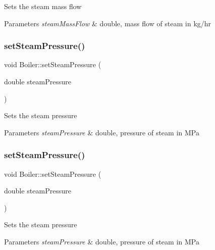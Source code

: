 Sets the steam mass flow 
\begin{DoxyParams}{Parameters}
{\em steam\+Mass\+Flow} & double, mass flow of steam in kg/hr \\
\hline
\end{DoxyParams}
\mbox{\label{class_boiler_a0a4619ff73c9969daebe3aa66ddad6be}} 
\subsubsection{\texorpdfstring{set\+Steam\+Pressure()}{setSteamPressure()}\hspace{0.1cm}{\footnotesize\ttfamily [1/3]}}
{\footnotesize\ttfamily void Boiler\+::set\+Steam\+Pressure (\begin{DoxyParamCaption}\item[{double}]{steam\+Pressure }\end{DoxyParamCaption})}

Sets the steam pressure 
\begin{DoxyParams}{Parameters}
{\em steam\+Pressure} & double, pressure of steam in M\+Pa \\
\hline
\end{DoxyParams}
\mbox{\label{class_boiler_a0a4619ff73c9969daebe3aa66ddad6be}} 
\subsubsection{\texorpdfstring{set\+Steam\+Pressure()}{setSteamPressure()}\hspace{0.1cm}{\footnotesize\ttfamily [2/3]}}
{\footnotesize\ttfamily void Boiler\+::set\+Steam\+Pressure (\begin{DoxyParamCaption}\item[{double}]{steam\+Pressure }\end{DoxyParamCaption})}

Sets the steam pressure 
\begin{DoxyParams}{Parameters}
{\em steam\+Pressure} & double, pressure of steam in M\+Pa \\
\hline
\end{DoxyParams}
\mbox{\label{class_boiler_a0a4619ff73c9969daebe3aa66ddad6be}} 
